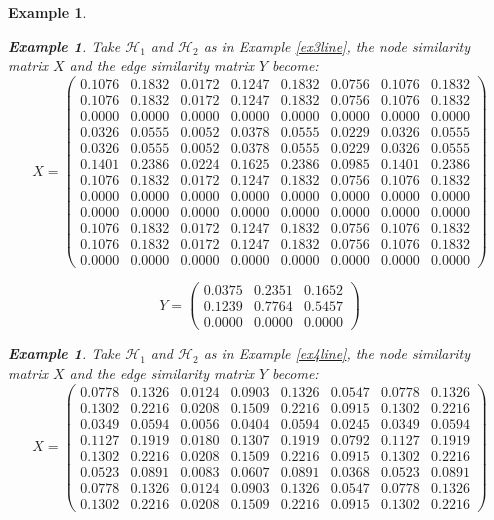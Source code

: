 \documentclass[a4paper,11pt]{report}
\newtheorem{example}[theorem]{Example}
\newcommand{\hgrafeen}{\mathcal{H}}
\begin{document}
\begin{example}
\begin{example}
  Take $\hgrafeen_1$ and $\hgrafeen_2$ as in Example \ref{ex3line}, the node 
  similarity matrix $X$ and the edge similarity matrix $Y$ become:
  $$X=\begin{pmatrix}
    0.1076&0.1832&0.0172&0.1247&0.1832&0.0756&0.1076&0.1832\\
0.1076&0.1832&0.0172&0.1247&0.1832&0.0756&0.1076&0.1832\\
0.0000&0.0000&0.0000&0.0000&0.0000&0.0000&0.0000&0.0000\\
0.0326&0.0555&0.0052&0.0378&0.0555&0.0229&0.0326&0.0555\\
0.0326&0.0555&0.0052&0.0378&0.0555&0.0229&0.0326&0.0555\\
0.1401&0.2386&0.0224&0.1625&0.2386&0.0985&0.1401&0.2386\\
0.1076&0.1832&0.0172&0.1247&0.1832&0.0756&0.1076&0.1832\\
0.0000&0.0000&0.0000&0.0000&0.0000&0.0000&0.0000&0.0000\\
0.0000&0.0000&0.0000&0.0000&0.0000&0.0000&0.0000&0.0000\\
0.1076&0.1832&0.0172&0.1247&0.1832&0.0756&0.1076&0.1832\\
0.1076&0.1832&0.0172&0.1247&0.1832&0.0756&0.1076&0.1832\\
0.0000&0.0000&0.0000&0.0000&0.0000&0.0000&0.0000&0.0000
  \end{pmatrix}$$
  
    $$Y=\begin{pmatrix}
    0.0375&0.2351&0.1652\\
0.1239&0.7764&0.5457\\
0.0000&0.0000&0.0000
  \end{pmatrix}$$
  

\end{example}
\begin{example}
  Take $\hgrafeen_1$ and $\hgrafeen_2$ as in Example \ref{ex4line}, the node 
  similarity matrix $X$ and the edge similarity matrix $Y$ become:
  $$X=\begin{pmatrix}
  0.0778&0.1326&0.0124&0.0903&0.1326&0.0547&0.0778&0.1326\\
0.1302&0.2216&0.0208&0.1509&0.2216&0.0915&0.1302&0.2216\\
0.0349&0.0594&0.0056&0.0404&0.0594&0.0245&0.0349&0.0594\\
0.1127&0.1919&0.0180&0.1307&0.1919&0.0792&0.1127&0.1919\\
0.1302&0.2216&0.0208&0.1509&0.2216&0.0915&0.1302&0.2216\\
0.0523&0.0891&0.0083&0.0607&0.0891&0.0368&0.0523&0.0891\\
0.0778&0.1326&0.0124&0.0903&0.1326&0.0547&0.0778&0.1326\\
0.1302&0.2216&0.0208&0.1509&0.2216&0.0915&0.1302&0.2216
  \end{pmatrix}$$
  

\end{example}
\end{example}
\end{document}
